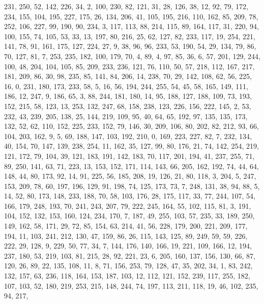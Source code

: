 \begin{DoxyCode}
       231, 250, 52, 142, 226, 34, 2, 100, 230, 82, 121, 31, 28, 126, 38, 12, 92, 79, 172, 234, 155, 104, 195, 227,
       175, 26, 134, 206, 41, 105, 195, 216, 110, 162, 85, 209, 78, 252, 106, 227, 99, 190, 90, 234, 3, 117, 113, 88,
       214, 115, 89, 164, 117, 31, 220, 94, 100, 155, 74, 105, 53, 33, 13, 197, 80, 216, 25, 62, 127, 82, 233,
       117, 19, 254, 221, 141, 78, 91, 161, 175, 127, 224, 27, 9, 38, 96, 96, 233, 53, 190, 54, 29, 134, 79, 86, 70,
       127, 81, 7, 253, 235, 182, 100, 179, 70, 4, 89, 4, 97, 85, 36, 6, 57, 201, 129, 244, 100, 48, 204, 104, 105,
       85, 209, 233, 236, 121, 76, 110, 50, 57, 218, 112, 167, 217, 181, 209, 86, 30, 98, 235, 85, 141, 84, 206,
       14, 238, 70, 29, 142, 108, 62, 56, 225, 16, 0, 231, 180, 173, 233, 58, 5, 16, 56, 194, 244, 255, 54, 45, 58,
       165, 149, 111, 186, 12, 247, 9, 186, 65, 3, 88, 244, 181, 180, 14, 95, 188, 127, 188, 109, 73, 193, 152, 215,
       58, 123, 13, 253, 132, 247, 68, 158, 238, 123, 226, 156, 222, 145, 2, 53, 232, 43, 239, 205, 138, 25, 144,
       219, 109, 95, 40, 64, 65, 192, 97, 135, 135, 173, 132, 52, 62, 110, 152, 225, 233, 152, 79, 146, 30, 209,
       106, 80, 202, 82, 212, 93, 66, 104, 203, 162, 9, 5, 69, 188, 147, 103, 192, 210, 0, 169, 223, 227, 82, 7, 232,
       134, 40, 154, 70, 147, 139, 238, 254, 11, 162, 35, 127, 99, 80, 176, 21, 74, 142, 254, 219, 121, 172, 79,
       104, 39, 121, 183, 191, 142, 183, 70, 117, 201, 194, 41, 237, 255, 71, 89, 250, 141, 63, 71, 223, 13, 153,
       152, 171, 114, 143, 66, 205, 162, 192, 74, 44, 64, 148, 44, 80, 173, 92, 14, 91, 225, 56, 185, 208, 19, 126,
       21, 80, 118, 3, 204, 5, 247, 153, 209, 78, 60, 197, 196, 129, 91, 198, 74, 125, 173, 73, 7, 248, 131, 38, 94,
       88, 5, 14, 52, 80, 173, 148, 233, 188, 70, 58, 103, 176, 28, 175, 117, 33, 77, 244, 107, 54, 166, 179, 248,
       193, 70, 241, 243, 207, 79, 222, 245, 164, 55, 102, 115, 81, 3, 191, 104, 152, 132, 153, 160, 124, 234,
       170, 7, 187, 49, 255, 103, 57, 235, 33, 189, 250, 149, 162, 58, 171, 29, 72, 85, 154, 63, 214, 41, 56, 228,
       179, 200, 221, 209, 177, 194, 11, 103, 241, 212, 130, 47, 159, 86, 26, 115, 143, 125, 89, 249, 59, 59, 226,
       222, 29, 128, 9, 229, 50, 77, 34, 7, 144, 176, 140, 166, 19, 221, 109, 166, 12, 194, 237, 180, 53, 219, 103,
       81, 215, 28, 92, 221, 23, 6, 205, 160, 137, 156, 130, 66, 87, 120, 26, 89, 22, 135, 108, 11, 8, 71, 156, 253,
       79, 128, 47, 35, 202, 34, 1, 83, 242, 132, 157, 63, 236, 118, 164, 153, 187, 103, 12, 112, 121, 152, 239,
       117, 255, 182, 107, 103, 52, 180, 219, 253, 215, 148, 244, 74, 197, 113, 211, 118, 19, 46, 102, 235, 94, 217,

\end{DoxyCode}
